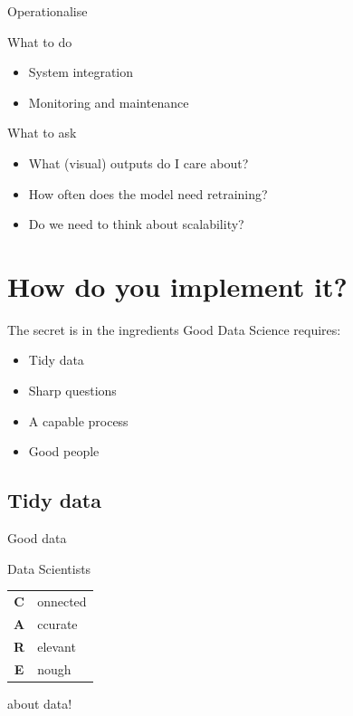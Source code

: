 \begin{frame}[t]{Operationalise}
    \begin{block}{What to do}
        \begin{itemize}
            \item System integration
            \item Monitoring and maintenance
        \end{itemize}
    \end{block}
    \vfill
    \begin{block}{What to ask}
        \begin{itemize}
            \item What (visual) outputs do I care about?
            \item How often does the model need retraining?
            \item Do we need to think about scalability?
        \end{itemize}
    \end{block}
\end{frame}

\section{How do you implement it?}

\begin{frame}{The secret is in the ingredients}
    Good Data Science requires:
    \begin{itemize}
        \item Tidy data
        \item Sharp questions
        \item A capable process
        \item Good people
    \end{itemize}
\end{frame}

\subsection{Tidy data}

\begin{frame}{Good data}
    \Large%
    \begin{center}
        Data Scientists
        \hspace{1em}
        \begin{tabular}{cl}
            \textbf{C} & onnected \\[0.25em]
            \textbf{A} & ccurate \\[0.25em]
            \textbf{R} & elevant \\[0.25em]
            \textbf{E} & nough \\
        \end{tabular}
        \hspace{1em}
        about data!
    \end{center}
\end{frame}


